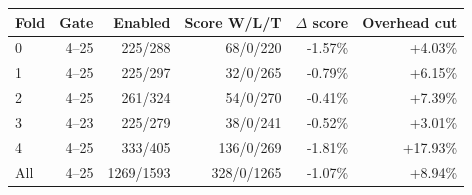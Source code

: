 \begin{tabular}{lrrrrr}
\toprule
Fold & Gate & Enabled & Score W/L/T & $\Delta$ score & Overhead cut \\
\midrule
0 & 4--25 & 225/288 & 68/0/220 & -1.57\% & +4.03\% \\
1 & 4--25 & 225/297 & 32/0/265 & -0.79\% & +6.15\% \\
2 & 4--25 & 261/324 & 54/0/270 & -0.41\% & +7.39\% \\
3 & 4--23 & 225/279 & 38/0/241 & -0.52\% & +3.01\% \\
4 & 4--25 & 333/405 & 136/0/269 & -1.81\% & +17.93\% \\
\midrule
All & 4--25 & 1269/1593 & 328/0/1265 & -1.07\% & +8.94\% \\
\bottomrule
\end{tabular}
